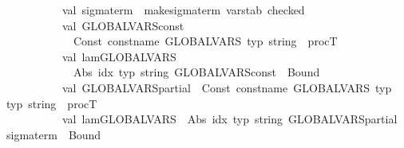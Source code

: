 \begin{isabellebody}
\ \ \ \ \ \ \ \ \ \ val\ sigma{}{\isacharunderscore}{\kern0pt}term\ {\isacharequal}{\kern0pt}\ make{\isacharunderscore}{\kern0pt}sigma{\isacharunderscore}{\kern0pt}term\ {\isacharparenleft}{\kern0pt}{\isacharhash}{\kern0pt}varstab\ checked{\isacharparenright}{\kern0pt}\ \ \ \ \isanewline
\ \ \ \ \ \ \isanewline
\ \ \ \ \ \ \ \ \ \ {\isacharparenleft}{\kern0pt}{\isacharasterisk}{\kern0pt}val\ GLOBALVARS{\isacharunderscore}{\kern0pt}const\ {\isacharequal}{\kern0pt}\isanewline
\ \ \ \ \ \ \ \ \ \ \ \ Const\ {\isacharparenleft}{\kern0pt}{\isacharat}{\kern0pt}{\isacharbraceleft}{\kern0pt}const{\isacharunderscore}{\kern0pt}name\ GLOBALVARS{\isacharbraceright}{\kern0pt}{\isacharcomma}{\kern0pt}\ {\isacharat}{\kern0pt}{\isacharbraceleft}{\kern0pt}typ\ string{\isacharbraceright}{\kern0pt}\ {\isacharminus}{\kern0pt}{\isacharminus}{\kern0pt}{\isachargreater}{\kern0pt}\ procT{\isacharparenright}{\kern0pt}\isanewline
\ \ \ \ \ \ \ \ \ \ \isanewline
\ \ \ \ \ \ \ \ \ \ val\ lam{\isacharunderscore}{\kern0pt}GLOBALVARS\ {\isacharequal}{\kern0pt}\isanewline
\ \ \ \ \ \ \ \ \ \ \ \ Abs\ {\isacharparenleft}{\kern0pt}{\isachardoublequote}{\kern0pt}idx{\isachardoublequote}{\kern0pt}{\isacharcomma}{\kern0pt}\ {\isacharat}{\kern0pt}{\isacharbraceleft}{\kern0pt}typ\ string{\isacharbraceright}{\kern0pt}{\isacharcomma}{\kern0pt}\ GLOBALVARS{\isacharunderscore}{\kern0pt}const\ {\isachardollar}{\kern0pt}\ Bound\ {}{\isacharparenright}{\kern0pt}{\isacharasterisk}{\kern0pt}{\isacharparenright}{\kern0pt}\isanewline
\isanewline
\ \ \ \ \ \ \ \ \ \ val\ GLOBALVARS{\isacharunderscore}{\kern0pt}partial\ {\isacharequal}{\kern0pt}\ Const\ {\isacharparenleft}{\kern0pt}{\isacharat}{\kern0pt}{\isacharbraceleft}{\kern0pt}const{\isacharunderscore}{\kern0pt}name\ GLOBALVARS{\isacharbraceright}{\kern0pt}{\isacharcomma}{\kern0pt}\ {\isacharat}{\kern0pt}{\isacharbraceleft}{\kern0pt}typ\ {\isasymsigma}{\isacharbraceright}{\kern0pt}\ {\isacharminus}{\kern0pt}{\isacharminus}{\kern0pt}{\isachargreater}{\kern0pt}\ {\isacharat}{\kern0pt}{\isacharbraceleft}{\kern0pt}typ\ string{\isacharbraceright}{\kern0pt}\ {\isacharminus}{\kern0pt}{\isacharminus}{\kern0pt}{\isachargreater}{\kern0pt}\ procT{\isacharparenright}{\kern0pt}\isanewline
\ \ \ \ \ \ \ \ \ \ val\ lam{\isacharunderscore}{\kern0pt}GLOBALVARS\ {\isacharequal}{\kern0pt}\ Abs\ {\isacharparenleft}{\kern0pt}{\isachardoublequote}{\kern0pt}idx{\isachardoublequote}{\kern0pt}{\isacharcomma}{\kern0pt}\ {\isacharat}{\kern0pt}{\isacharbraceleft}{\kern0pt}typ\ string{\isacharbraceright}{\kern0pt}{\isacharcomma}{\kern0pt}\ GLOBALVARS{\isacharunderscore}{\kern0pt}partial\ {\isachardollar}{\kern0pt}\ sigma{}{\isacharunderscore}{\kern0pt}term\ {\isachardollar}{\kern0pt}\ Bound\ {}{\isacharparenright}{\kern0pt}\isanewline

\end{isabellebody}
